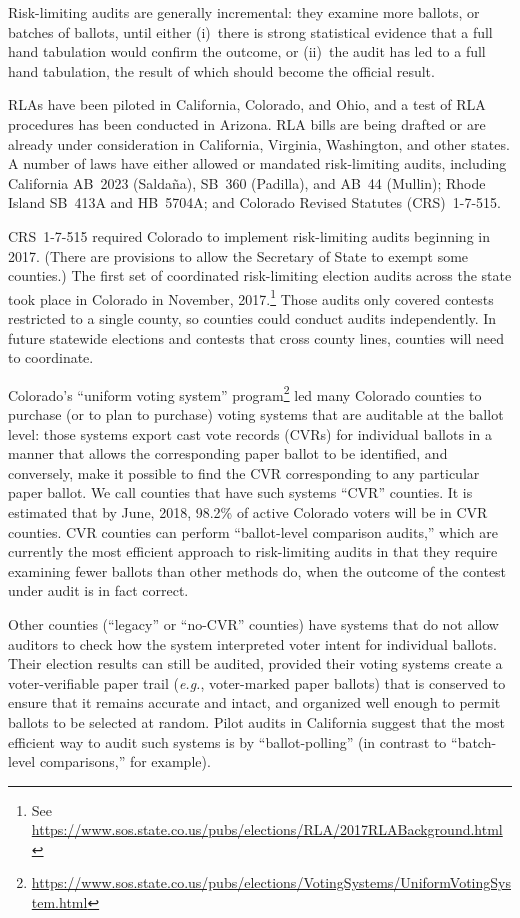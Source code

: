 \documentclass[12pt]{article}
\begin{document}
Risk-limiting audits are generally incremental: they examine more ballots, or batches of ballots,
until either (i)~there is strong statistical evidence that a full hand tabulation would confirm the outcome,
or (ii)~the audit has led to a full hand tabulation, the result of which should become the official
result.

RLAs have been piloted in California, Colorado, and Ohio, and a test of
RLA procedures has been conducted in Arizona.
RLA bills are being drafted or are already under consideration in California,
Virginia, Washington, and other states.
A number of laws have either allowed or mandated risk-limiting audits,
including California AB~2023 (Salda\~{n}a), SB~360 (Padilla), and AB~44 (Mullin);
Rhode Island SB~413A and HB~5704A; and Colorado Revised Statutes (CRS)~1-7-515.

CRS~1-7-515 required 
Colorado to implement risk-limiting audits beginning in 2017.
(There are provisions to allow the Secretary of State to exempt some counties.)
The first set of coordinated risk-limiting election audits across the state took place in Colorado in November, 2017.\footnote{%
 See \url{https://www.sos.state.co.us/pubs/elections/RLA/2017RLABackground.html}
}
Those audits only covered contests restricted to a single county,
so counties could conduct audits independently.
In future statewide elections and contests that cross county lines, counties will need to coordinate.

Colorado's ``uniform voting system'' program\footnote{%
\url{https://www.sos.state.co.us/pubs/elections/VotingSystems/UniformVotingSystem.html}
} led
many Colorado counties to purchase (or to plan to purchase) voting systems
that are auditable at the ballot level: those systems export cast vote records (CVRs)
for individual ballots in a manner that allows the corresponding paper ballot to be identified,
and conversely, make it possible to find the CVR corresponding to any
particular paper ballot.
We call counties that have such systems ``CVR'' counties.
It is estimated that by June, 2018, 98.2\% of active Colorado voters will be in CVR counties.
CVR counties can perform ``ballot-level comparison audits,'' \citep{lindemanStark12} 
which are currently the
most efficient approach to risk-limiting audits in that they require examining
fewer ballots than other methods do, when the outcome of the contest under audit 
is in fact correct.

Other counties (``legacy'' or ``no-CVR'' counties) 
have systems that do not allow auditors to check how the system
interpreted voter intent for individual ballots.
Their election results can still be audited, provided their voting systems
create a voter-verifiable paper trail (\emph{e.g.}, voter-marked paper ballots) that is
conserved to ensure that it remains accurate and intact, and organized well enough
to permit ballots to be selected at random.
Pilot audits in California suggest that the most efficient way to audit such systems
is by ``ballot-polling'' \citep{lindemanEtal12,lindemanStark12} 
(in contrast to ``batch-level comparisons,'' for example).
\end{document}
